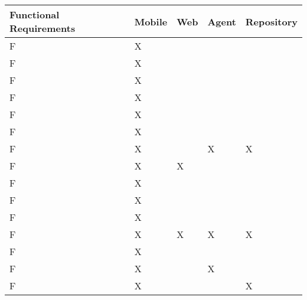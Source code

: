 
\newcommand\rownum{
	\stepcounter{rownumbers}
	F\arabic{rownumbers}
}

\begin{tabular}{ | l | l | l | l | l |}
\hline
Functional Requirements 											& Mobile & Web & Agent & Repository \\ \hline
\rownum                                                                & X      &     &       &            \\ \hline
\rownum                                                                & X      &     &       &            \\ \hline
\rownum                                                                & X      &     &       &            \\ \hline
\rownum                                                                & X      &     &       &            \\ \hline
\rownum                                                                & X      &     &       &            \\ \hline
\rownum                                                                & X      &     &       &            \\ \hline
\rownum                                                                & X      &     & X     & X          \\ \hline
\rownum                                                                & X      & X   &       &            \\ \hline
\rownum                                                               & X      &     &       &            \\ \hline
\rownum                                                               & X      &     &       &            \\ \hline
\rownum                                                               & X      &     &       &            \\ \hline
\rownum                                                               & X      & X   & X     & X          \\ \hline
\rownum                                                               & X      &     &       &            \\ \hline
\rownum                                                               & X      &     & X     &            \\ \hline
\rownum                                                               & X      &     &       & X          \\ \hline

\end{tabular}
